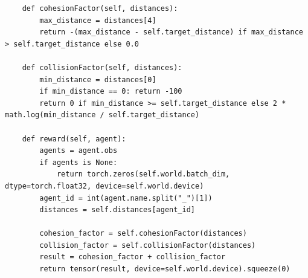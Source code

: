\documentclass[12pt,a4paper,openright,twoside]{book}
\begin{document}
\begin{lstlisting}
    def cohesionFactor(self, distances):
        max_distance = distances[4]
        return -(max_distance - self.target_distance) if max_distance > self.target_distance else 0.0

    def collisionFactor(self, distances):
        min_distance = distances[0]
        if min_distance == 0: return -100
        return 0 if min_distance >= self.target_distance else 2 * math.log(min_distance / self.target_distance)
    
    def reward(self, agent):
        agents = agent.obs
        if agents is None:
            return torch.zeros(self.world.batch_dim, dtype=torch.float32, device=self.world.device)
        agent_id = int(agent.name.split("_")[1])
        distances = self.distances[agent_id]

        cohesion_factor = self.cohesionFactor(distances)
        collision_factor = self.collisionFactor(distances)
        result = cohesion_factor + collision_factor
        return tensor(result, device=self.world.device).squeeze(0)
\end{lstlisting}
\end{document}
